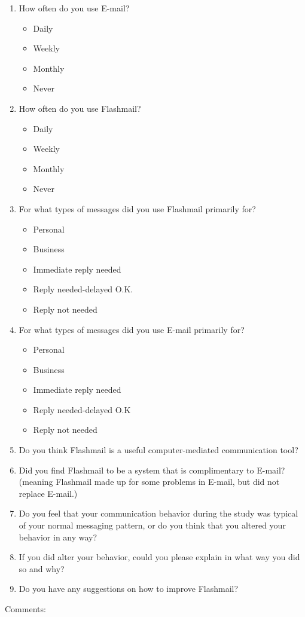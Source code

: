 \begin{enumerate}
\item How often do you use E-mail?
  \begin{itemize}
  \item Daily \item Weekly \item Monthly \item Never
  \end{itemize}
\item How often do you use Flashmail?
  \begin{itemize}
  \item Daily \item Weekly \item Monthly \item Never
  \end{itemize}
\item For what types of messages did you use Flashmail primarily for?
  \begin{itemize}
  \item Personal \item Business \item Immediate reply needed \item
    Reply needed-delayed O.K. \item Reply not needed
  \end{itemize}
\item For what types of messages did you use E-mail primarily for?
  \begin{itemize}
  \item Personal \item Business \item Immediate reply needed \item
    Reply needed-delayed O.K \item Reply not needed
  \end{itemize}
\item Do you think Flashmail is a useful computer-mediated communication
  tool?
\item Did you find Flashmail to be a system that is complimentary to
  E-mail? (meaning Flashmail made up for some problems in E-mail, but did
  not replace E-mail.)
\item Do you feel that your communication behavior during the study was
  typical of your normal messaging pattern, or do you think that you
  altered your behavior in any way?
\item If you did alter your behavior, could you please explain in what way
  you did so and why?
\item Do you have any suggestions on how to improve Flashmail?
\end{enumerate}
Comments: \nocite{*}  
\printindex




















